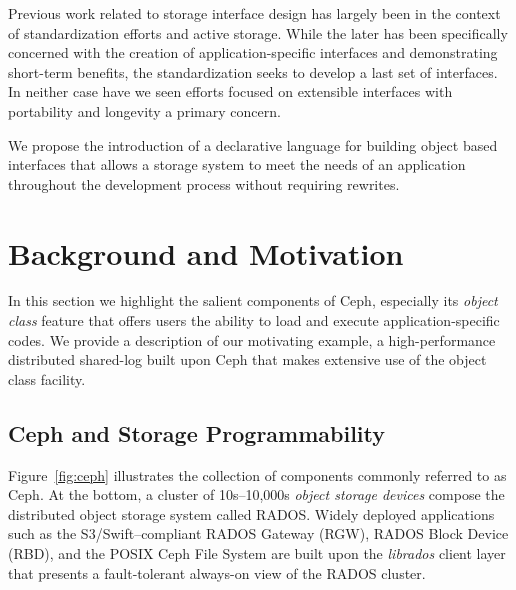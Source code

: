 \documentclass[10pt,twocolumn]{article}
\begin{document}
Previous work related to storage interface design has largely been in the
context of standardization efforts and active storage. While the later has
been specifically concerned with the creation of application-specific
interfaces and demonstrating short-term benefits, the standardization seeks to
develop a last set of interfaces. In neither case have we seen efforts focused
on extensible interfaces with portability and longevity a primary concern.


We propose the introduction of a declarative language for building object
based interfaces that allows a storage system to meet the needs of an
application throughout the development process without requiring rewrites.

\section{Background and Motivation}

In this section we highlight the salient components of Ceph, especially its
\emph{object class} feature that offers users the ability to load and execute
application-specific codes. We provide a description of our motivating
example, a high-performance distributed shared-log built upon Ceph that makes
extensive use of the object class facility.

\subsection{Ceph and Storage Programmability}
\label{sec:objclass}

Figure~\ref{fig:ceph} illustrates the collection of components commonly
referred to as Ceph. At the bottom, a cluster of 10s--10,000s \emph{object
storage devices} compose the distributed object storage system called RADOS.
Widely deployed applications such as the S3/Swift--compliant RADOS Gateway
(RGW), RADOS Block Device (RBD), and the POSIX Ceph File System are built upon
the \emph{librados} client layer that presents a fault-tolerant always-on view
of the RADOS cluster.
\end{document}
